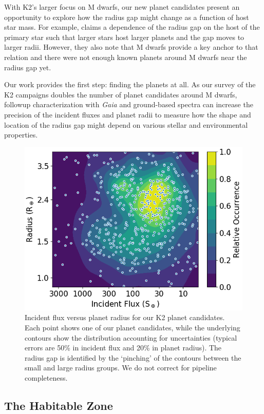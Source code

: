 \documentclass[twocolumn]{aastex62}
\newcommand{\project}[1]{\textsl{#1}}
\begin{document}
With K2's larger focus on M dwarfs, our new planet candidates present
an opportunity to explore how the radius gap might change as a
function of host star mass. For example, \cite{wu18} claims a
dependence of the radius gap on the host of the primary star such that
larger stars host larger planets and the gap moves to larger
radii. However, they also note that M dwarfs provide a key anchor to
that relation and there were not enough known planets around M dwarfs
near the radius gap yet.

Our work provides the first step: finding the planets at all. As our
survey of the K2 campaigns doubles the number of planet candidates
around M dwarfs, followup characterization with \project{Gaia} and
ground-based spectra can increase the precision of the incident fluxes
and planet radii to measure how the shape and location of the radius
gap might depend on various stellar and environmental properties.

\begin{figure}[tbp]
\includegraphics[width=\columnwidth]{insolation.png}
\caption{ Incident flux versus planet radius for our K2 planet
  candidates. Each point shows one of our planet candidates, while the
  underlying contours show the distribution accounting for
  uncertainties (typical errors are 50\% in incident flux and 20\% in
  planet radius). The radius gap is identified by the `pinching' of
  the contours between the small and large radius groups.  We do not
  correct for pipeline completeness. \label{insolation}}
\end{figure}


\subsection{The Habitable Zone}
\label{sec:HZ}
\end{document}
